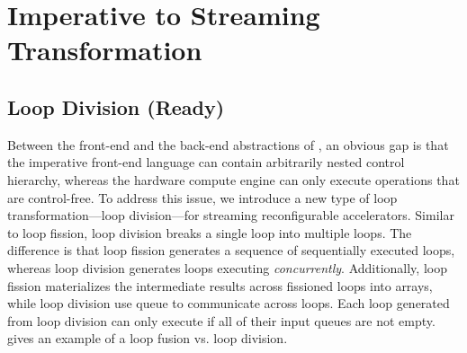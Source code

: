 \section{Imperative to Streaming Transformation}
\label{sec:control}



\subsection{Loop Division (Ready)}
Between the front-end and the back-end abstractions of \name, an obvious gap is that 
the imperative front-end language can contain arbitrarily nested control hierarchy, whereas
the hardware compute engine can only execute operations that are control-free.
To address this issue, we introduce a new type of loop transformation---loop division---for streaming reconfigurable
accelerators.
Similar to loop fission, loop division breaks a single loop into multiple loops.
The difference is that loop fission generates a sequence of sequentially executed loops, whereas
loop division generates loops executing \emph{concurrently}.
Additionally, loop fission materializes the intermediate results across fissioned loops into arrays,
while loop division use queue to communicate across loops.
Each loop generated from loop division can only execute if all of their input queues are not empty.
 gives an example of a loop fusion vs. loop division.

